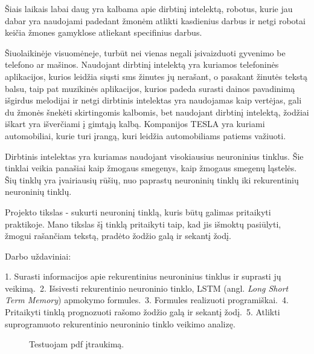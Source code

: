 Šiais laikais labai daug yra kalbama apie dirbtinį intelektą, robotus, kurie jau dabar yra naudojami padedant žmonėm atlikti kasdienius darbus ir netgi robotai keičia žmones gamyklose atliekant specifinius darbus.

Šiuolaikinėje visuomėneje, turbūt nei vienas negali įsivaizduoti gyvenimo be telefono ar mašinos. Naudojant dirbtinį intelektą yra kuriamos telefoninės aplikacijos, kurios leidžia siųsti sms žinutes jų nerašant, o pasakant žinutės tekstą balsu, taip pat muzikinės aplikacijos, kurios padeda surasti dainos pavadinimą išgirdus melodijai ir netgi dirbtinis intelektas yra naudojamas kaip vertėjas, gali du žmonės šnekėti skirtingomis kalbomis, bet naudojant dirbtinį intelektą, žodžiai iškart yra išverčiami į gimtąją kalbą. Kompanijos TESLA yra kuriami automobiliai, kurie turi įrangą, kuri leidžia automobiliams patiems važiuoti.

Dirbtinis intelektas yra kuriamas naudojant visokiausius neuroninius tinklus. Šie tinklai veikia panašiai kaip žmogaus smegenys, kaip žmogaus smegenų ląstelės. Šių tinklų yra įvairiausių rūšių, nuo paprastų neuroninių tinklų iki rekurentinių neuroninių tinklų.

Projekto tikslas - sukurti neuroninį tinklą, kuris būtų galimas pritaikyti praktikoje. Mano tikslas šį tinklą pritaikyti taip, kad jis išmoktų pasiūlyti, žmogui rašančiam tekstą, pradėto žodžio galą ir sekantį žodį.

Darbo uždaviniai:

1. Surasti informacijos apie rekurentinius neuroninius tinklus ir suprasti jų veikimą.\
2. Išsivesti rekurentinio neuroninio tinklo, LSTM (angl. \textit{Long Short Term Memory}) apmokymo formules.\
3. Formules realizuoti programiškai.\
4. Pritaikyti tinklą prognozuoti rašomo žodžio galą ir sekantį žodį.\
5. Atlikti suprogramuoto rekurentinio neuroninio tinklo veikimo analizę.\

\begin{figure}
  \centering
\scalebox{0.5}{\texttt{[image: images/test.pdf]}}
\caption{Testuojam pdf įtraukimą.}
\end{figure}
